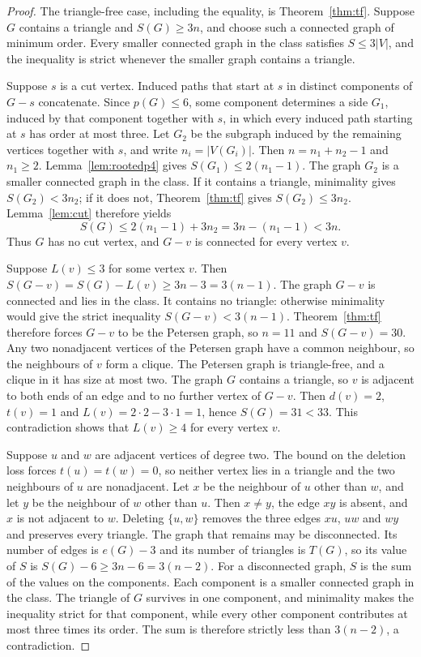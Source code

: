 \documentclass[ASNA]{USG}
\theoremstyle{WBstyletwo}
\numberwithin{equation}{section}
\newcommand{\pp}{p}
\begin{document}
\begin{proof}
The triangle-free case, including the equality, is Theorem~\ref{thm:tf}. Suppose $G$ contains a triangle and $S(G)\ge 3n$, and choose such a connected graph of minimum order. Every smaller connected graph in the class satisfies $S\le 3|V|$, and the inequality is strict whenever the smaller graph contains a triangle.

Suppose $s$ is a cut vertex. Induced paths that start at $s$ in distinct components of $G-s$ concatenate. Since $\pp(G)\le 6$, some component determines a side $G_1$, induced by that component together with $s$, in which every induced path starting at $s$ has order at most three. Let $G_2$ be the subgraph induced by the remaining vertices together with $s$, and write $n_i=|V(G_i)|$. Then $n=n_1+n_2-1$ and $n_1\ge 2$. Lemma~\ref{lem:rootedp4} gives $S(G_1)\le 2(n_1-1)$. The graph $G_2$ is a smaller connected graph in the class. If it contains a triangle, minimality gives $S(G_2)<3n_2$; if it does not, Theorem~\ref{thm:tf} gives $S(G_2)\le 3n_2$. Lemma~\ref{lem:cut} therefore yields
\[
S(G)\le 2(n_1-1)+3n_2=3n-(n_1-1)<3n.
\]
Thus $G$ has no cut vertex, and $G-v$ is connected for every vertex $v$.

Suppose $L(v)\le 3$ for some vertex $v$. Then $S(G-v)=S(G)-L(v)\ge 3n-3=3(n-1)$. The graph $G-v$ is connected and lies in the class. It contains no triangle: otherwise minimality would give the strict inequality $S(G-v)<3(n-1)$. Theorem~\ref{thm:tf} therefore forces $G-v$ to be the Petersen graph, so $n=11$ and $S(G-v)=30$. Any two nonadjacent vertices of the Petersen graph have a common neighbour, so the neighbours of $v$ form a clique. The Petersen graph is triangle-free, and a clique in it has size at most two. The graph $G$ contains a triangle, so $v$ is adjacent to both ends of an edge and to no further vertex of $G-v$. Then $d(v)=2$, $t(v)=1$ and $L(v)=2\cdot 2-3\cdot 1=1$, hence $S(G)=31<33$. This contradiction shows that $L(v)\ge 4$ for every vertex $v$.

Suppose $u$ and $w$ are adjacent vertices of degree two. The bound on the deletion loss forces $t(u)=t(w)=0$, so neither vertex lies in a triangle and the two neighbours of $u$ are nonadjacent. Let $x$ be the neighbour of $u$ other than $w$, and let $y$ be the neighbour of $w$ other than $u$. Then $x\neq y$, the edge $xy$ is absent, and $x$ is not adjacent to $w$. Deleting $\{u,w\}$ removes the three edges $xu$, $uw$ and $wy$ and preserves every triangle. The graph that remains may be disconnected. Its number of edges is $e(G)-3$ and its number of triangles is $T(G)$, so its value of $S$ is $S(G)-6\ge 3n-6=3(n-2)$. For a disconnected graph, $S$ is the sum of the values on the components. Each component is a smaller connected graph in the class. The triangle of $G$ survives in one component, and minimality makes the inequality strict for that component, while every other component contributes at most three times its order. The sum is therefore strictly less than $3(n-2)$, a contradiction.


\end{proof}
\end{document}

